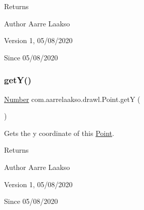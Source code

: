 \begin{DoxyReturn}{Returns}

\end{DoxyReturn}
\begin{DoxyAuthor}{Author}
Aarre Laakso 
\end{DoxyAuthor}
\begin{DoxyVersion}{Version}
1, 05/08/2020 
\end{DoxyVersion}
\begin{DoxySince}{Since}
05/08/2020 
\end{DoxySince}
\mbox{\label{classcom_1_1aarrelaakso_1_1drawl_1_1_point_a8247f55c36600e067be27a1586255767}} 
\subsubsection{\texorpdfstring{get\+Y()}{getY()}}
{\footnotesize\ttfamily \hyperlink{interfacecom_1_1aarrelaakso_1_1drawl_1_1_number}{Number} com.\+aarrelaakso.\+drawl.\+Point.\+getY (\begin{DoxyParamCaption}{ }\end{DoxyParamCaption})\hspace{0.3cm}{\ttfamily [protected]}}



Gets the y coordinate of this \hyperlink{classcom_1_1aarrelaakso_1_1drawl_1_1_point}{Point}. 

\begin{DoxyReturn}{Returns}

\end{DoxyReturn}
\begin{DoxyAuthor}{Author}
Aarre Laakso 
\end{DoxyAuthor}
\begin{DoxyVersion}{Version}
1, 05/08/2020 
\end{DoxyVersion}
\begin{DoxySince}{Since}
05/08/2020 
\end{DoxySince}
\mbox{\label{classcom_1_1aarrelaakso_1_1drawl_1_1_point_acf1cca24c7cf879f402e1b549a5e3864}} 
